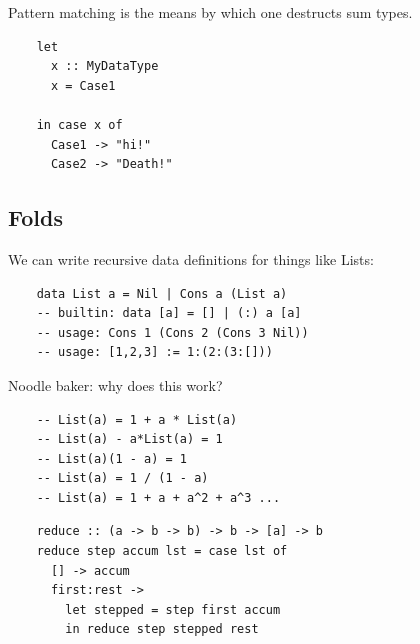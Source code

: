 \documentclass[tikz]{beamer}
\theoremstyle{definition}
\begin{document}
\begin{frame}[fragile]

Pattern matching is the means by which one destructs sum types.
\begin{center}
	\begin{verbatim}
	let 
	  x :: MyDataType
	  x = Case1
			
	in case x of 
	  Case1 -> "hi!"
	  Case2 -> "Death!"  
	\end{verbatim}
\end{center}
\end{frame}

\subsection{Folds}



\begin{frame}[fragile]
	We can write recursive data definitions for things like Lists: 

\begin{center}
	\begin{verbatim}
	data List a = Nil | Cons a (List a)
	-- builtin: data [a] = [] | (:) a [a]
	-- usage: Cons 1 (Cons 2 (Cons 3 Nil))
	-- usage: [1,2,3] := 1:(2:(3:[])) 
	\end{verbatim}
\end{center}
\end{frame}

\begin{frame}[fragile]
	Noodle baker: why does this work?
	
	\begin{center}
	\begin{verbatim}
	-- List(a) = 1 + a * List(a)
	-- List(a) - a*List(a) = 1
	-- List(a)(1 - a) = 1
	-- List(a) = 1 / (1 - a)
	-- List(a) = 1 + a + a^2 + a^3 ...
	\end{verbatim}
	\end{center}
\end{frame}

\begin{frame}[fragile]
\begin{center}
	\begin{verbatim}
	reduce :: (a -> b -> b) -> b -> [a] -> b
	reduce step accum lst = case lst of 
	  [] -> accum 
	  first:rest -> 
	    let stepped = step first accum
	    in reduce step stepped rest
	\end{verbatim}
\end{center}

\end{frame}
\end{document}
